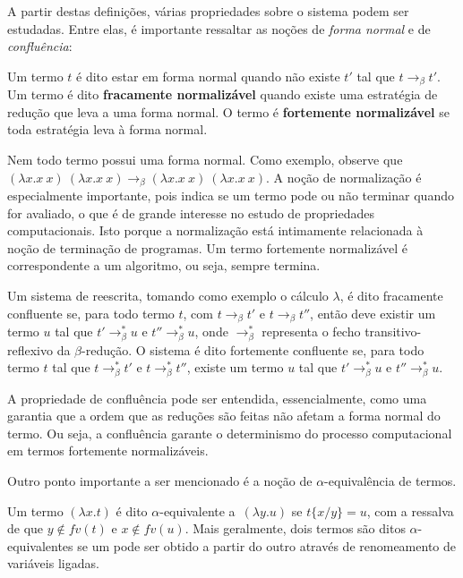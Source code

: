 A partir destas definições, várias propriedades sobre o sistema podem ser
estudadas. Entre elas, é importante ressaltar as noções de \textit{forma
 normal} e de \textit{confluência}:

\begin{definicao}\label{def_normal}
    Um termo $t$ é dito estar em forma normal quando não existe $t'$ tal que $ t
    \rightarrow_{\beta} t' $.  Um termo é dito \textbf{fracamente normalizável} quando
    existe uma estratégia de redução que leva a uma forma normal. O termo é
    \textbf{fortemente normalizável} se toda estratégia leva à forma normal.
\end{definicao}

Nem todo termo possui uma forma normal. Como exemplo, observe que $ (\lambda
x.x\ x)\ (\lambda x.x\ x) \rightarrow_\beta (\lambda x.x\ x)\ (\lambda x.x\ x)
$. A noção de normalização é especialmente importante, pois indica se um termo
pode ou não terminar quando for avaliado, o que é de grande interesse no estudo
de propriedades computacionais. Isto porque a normalização está intimamente
relacionada à noção de terminação de programas. Um termo fortemente normalizável
é correspondente a um algoritmo, ou seja, sempre termina.

\begin{definicao}[Confluência]
    Um sistema de reescrita, tomando como exemplo o cálculo $\lambda$, é dito
    fracamente confluente se, para todo termo $t$, com $ t \rightarrow_\beta t' $
    e $ t \rightarrow_\beta t'' $, então deve existir um termo $u$ tal que $t'
    \rightarrow_\beta^* u$ e $t'' \rightarrow_\beta^* u$, onde
    $\rightarrow_\beta^*$ representa o fecho transitivo-reflexivo da
    $\beta$-redução.  O sistema é dito fortemente confluente se, para todo termo
    $t$ tal que $ t \rightarrow_\beta^* t' $ e $ t \rightarrow_\beta^* t'' $,
    existe um termo $u$ tal que $t' \rightarrow_\beta^* u$ e $t''
    \rightarrow_\beta^* u$. 
\end{definicao}

A propriedade de confluência pode ser entendida, essencialmente, como uma
garantia que a ordem que as reduções são feitas não afetam a forma normal do
termo. Ou seja, a confluência garante o determinismo do processo computacional
em termos fortemente normalizáveis.


Outro ponto importante a ser mencionado é a noção de $\alpha$-equivalência de
termos. 

\begin{definicao}
    Um termo $(\lambda x. t)$ é dito $\alpha$-equivalente a\ $(\lambda y. u)$ se
    $ t\{x/y\} = u $, com a ressalva de que $y \notin fv(t)$ e $x \notin fv(u)$.
    Mais geralmente, dois termos são ditos $\alpha$-equivalentes se um pode ser
    obtido a partir do outro através de renomeamento de variáveis ligadas. 
\end{definicao}

